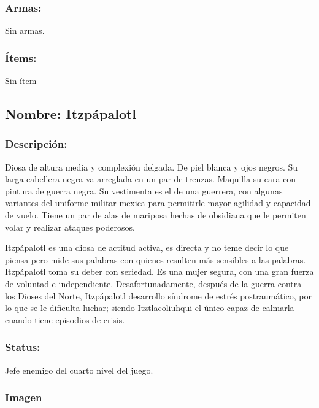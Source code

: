\documentclass[11pt,letterpaper]{article}
\begin{document}
\subsubsection{Armas:}
Sin armas.
\subsubsection{Ítems:}
Sin ítem


\subsection{Nombre: Itzpápalotl}  
\subsubsection{Descripción:}
Diosa de altura media y complexión delgada. De piel blanca y ojos negros. Su larga cabellera negra va arreglada en un par de trenzas. Maquilla su cara con pintura de guerra negra. Su vestimenta es el de una guerrera, con algunas variantes del uniforme militar mexica para permitirle mayor agilidad y capacidad de vuelo.  Tiene un par de alas de mariposa hechas de obsidiana que le permiten volar y realizar ataques poderosos.    

Itzpápalotl es una diosa de actitud activa, es directa y no teme decir lo que piensa pero mide sus palabras con quienes resulten más sensibles a las palabras. Itzpápalotl toma su deber con seriedad. Es una mujer segura, con una gran fuerza de voluntad e independiente. Desafortunadamente, después de la guerra contra los Dioses del Norte, Itzpápalotl desarrollo síndrome de estrés postraumático, por lo que se le dificulta luchar; siendo Itztlacoliuhqui  el único capaz de calmarla cuando tiene episodios de crisis.
\subsubsection{Status:}
Jefe enemigo del cuarto nivel del juego.
\subsubsection{Imagen}
\end{document}

